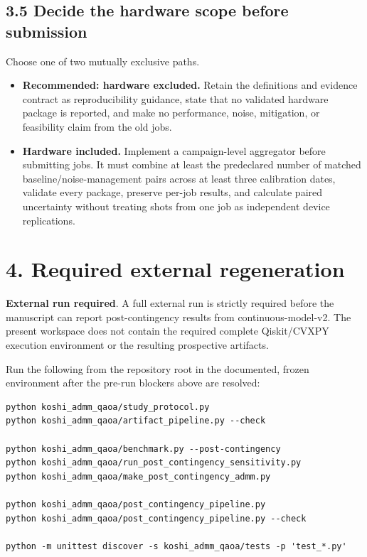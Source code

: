 \documentclass[11pt]{article}
\newcommand{\external}{\textcolor{externalblue}{\textbf{External run required}}}
\begin{document}
\subsection*{3.5 Decide the hardware scope before submission}

Choose one of two mutually exclusive paths.

\begin{itemize}
  \item \textbf{Recommended: hardware excluded.} Retain the definitions and evidence
  contract as reproducibility guidance, state that no validated hardware
  package is reported, and make no performance, noise, mitigation, or
  feasibility claim from the old jobs.
  \item \textbf{Hardware included.} Implement a campaign-level aggregator before
  submitting jobs.  It must combine at least the predeclared number of matched
  baseline/noise-management pairs across at least three calibration dates,
  validate every package, preserve per-job results, and calculate paired
  uncertainty without treating shots from one job as independent device
  replications.
\end{itemize}

\section*{4. Required external regeneration}

\external.  A full external run is strictly required before the manuscript
can report post-contingency results from continuous-model-v2.  The present
workspace does not contain the required complete Qiskit/CVXPY execution
environment or the resulting prospective artifacts.

Run the following from the repository root in the documented, frozen
environment after the pre-run blockers above are resolved:

\begin{verbatim}
python koshi_admm_qaoa/study_protocol.py
python koshi_admm_qaoa/artifact_pipeline.py --check

python koshi_admm_qaoa/benchmark.py --post-contingency
python koshi_admm_qaoa/run_post_contingency_sensitivity.py
python koshi_admm_qaoa/make_post_contingency_admm.py

python koshi_admm_qaoa/post_contingency_pipeline.py
python koshi_admm_qaoa/post_contingency_pipeline.py --check

python -m unittest discover -s koshi_admm_qaoa/tests -p 'test_*.py'
\end{verbatim}
\end{document}
